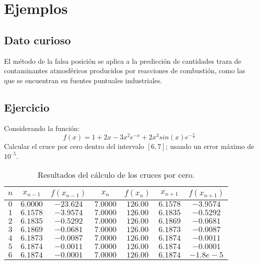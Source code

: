 \section{Ejemplos}

\subsection{Dato curioso}
El método de la falsa posición se aplica a la predicción de cantidades traza de contaminantes atmosféricos producidos por reacciones de combustión, como las que se encuentran en fuentes puntuales industriales.

\subsection{Ejercicio}
Considerando la función:
\begin{displaymath}
    f(x) = 1 + 2x - 3x^2e^{-x} + 2x^3sin(x)e^{- \frac{x}{5}}
\end{displaymath}
Calcular el cruce por cero dentro del intervalo $ [6, 7] $; usando un error máximo de $ 10^{–5} $.

\begin{table}[h!]
    \centering
    \caption{Resultados del cálculo de los cruces por cero.}
    \label{table1_regula_falsi}
    \begin{tabular}{c|c|c|c|c|c|c}
        \textbf{$ n $} & \textbf{$ x_{n-1} $} & \textbf{$ f(x_{n-1}) $} & \textbf{$ x_n $} & \textbf{$ f(x_n) $} & \textbf{$ x_{n+1} $} & \textbf{$ f(x_{n+1}) $}\\
        \hline
         $ 0 $ & $ 6.0000 $ & $ -23.624 $ & $ 7.0000 $ & $ 126.00 $ & $ 6.1578 $ & $ -3.9574 $ \\
         $ 1 $ & $ 6.1578 $ & $ -3.9574 $ & $ 7.0000 $ & $ 126.00 $ & $ 6.1835 $ & $ -0.5292 $ \\ 
         $ 2 $ & $ 6.1835 $ & $ -0.5292 $ & $ 7.0000 $ & $ 126.00 $ & $ 6.1869 $ & $ -0.0681 $ \\ 
         $ 3 $ & $ 6.1869 $ & $ -0.0681 $ & $ 7.0000 $ & $ 126.00 $ & $ 6.1873 $ & $ -0.0087 $ \\ 
         $ 4 $ & $ 6.1873 $ & $ -0.0087 $ & $ 7.0000 $ & $ 126.00 $ & $ 6.1874 $ & $ -0.0011 $ \\ 
         $ 5 $ & $ 6.1874 $ & $ -0.0011 $ & $ 7.0000 $ & $ 126.00 $ & $ 6.1874 $ & $ -0.0001 $ \\ 
         $ 6 $ & $ 6.1874 $ & $ -0.0001 $ & $ 7.0000 $ & $ 126.00 $ & $ 6.1874 $ & $ -1.8e-5 $ \\ 
    \end{tabular}
\end{table}

